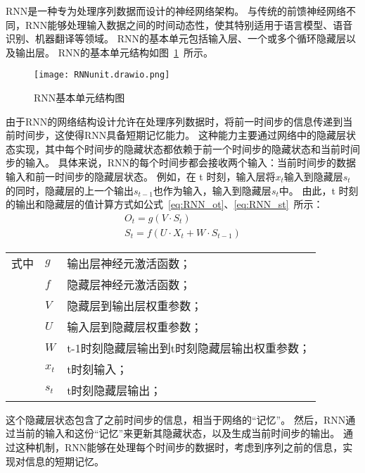 RNN是一种专为处理序列数据而设计的神经网络架构。
与传统的前馈神经网络不同，RNN能够处理输入数据之间的时间动态性，使其特别适用于语言模型、语音识别、机器翻译等领域。
RNN的基本单元包括输入层、一个或多个循环隐藏层以及输出层。
RNN的基本单元结构如图~\ref{fig:RNNunit}~所示。
\begin{figure}[htbp] 
  \centering
  \texttt{[image: RNNunit.drawio.png]}
  \caption{RNN基本单元结构图}
  \label{fig:RNNunit}
\end{figure}


由于RNN的网络结构设计允许在处理序列数据时，将前一时间步的信息传递到当前时间步，这使得RNN具备短期记忆能力。
这种能力主要通过网络中的隐藏层状态实现，其中每个时间步的隐藏状态都依赖于前一个时间步的隐藏状态和当前时间步的输入。
具体来说，RNN的每个时间步都会接收两个输入：当前时间步的数据输入和前一时间步的隐藏层状态。
例如，在 t 时刻，输入层将$x_t$输入到隐藏层$s_t$的同时，隐藏层的上一个输出$s_{t-1}$也作为输入，输入到隐藏层$s_t$中。
由此，t 时刻的输出和隐藏层的值计算方式如公式~\ref{eq:RNN_ot}、\ref{eq:RNN_st}~所示：
\begin{gather}
  O_t = g(V \cdot S_t) \label{eq:RNN_ot} \\
  S_t = f(U \cdot X_t + W \cdot S_{t-1}) \label{eq:RNN_st}
\end{gather}
\begin{flushleft}
  \renewcommand\arraystretch{1.25}
  \begin{tabularx}{\textwidth}{@{}>{\normalsize\rm}l@{\quad}>{\normalsize\rm}l@{——}>{\normalsize\rm}X@{}}
  式中
  &  $g$ &输出层神经元激活函数；\\
  &  $f$ &隐藏层神经元激活函数；\\
  &  $V$   &隐藏层到输出层权重参数；\\
  &  $U$ & 输入层到隐藏层权重参数；\\
  &  $W$ & t-1时刻隐藏层输出到t时刻隐藏层输出权重参数；\\
  &  $x_t$ &t时刻输入；\\
  &  $s_t$ & t时刻隐藏层输出；\\
  \end{tabularx}\vspace{.5ex}%
\end{flushleft}

这个隐藏层状态包含了之前时间步的信息，相当于网络的“记忆”。
然后，RNN通过当前的输入和这份“记忆”来更新其隐藏状态，以及生成当前时间步的输出。
通过这种机制，RNN能够在处理每个时间步的数据时，考虑到序列之前的信息，实现对信息的短期记忆。

